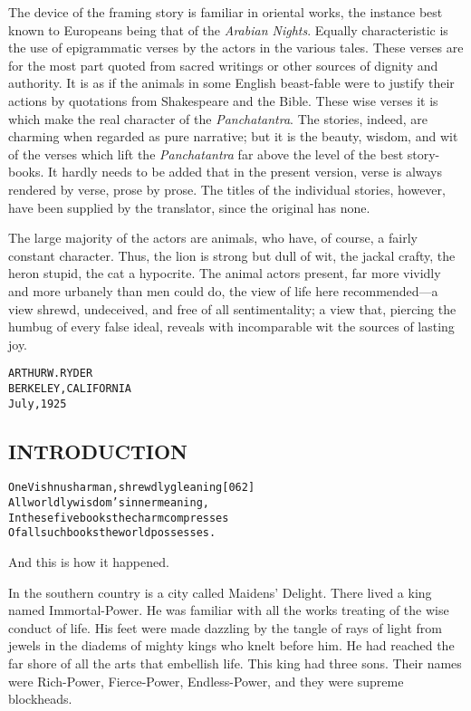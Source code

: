 \documentclass{article}
\renewenvironment{verbatim}{\begin{alltt}\normalfont\begin{centering}}{\end{centering}\end{alltt}}
\begin{document}
The device of the framing story is familiar in oriental works, the
instance best known to Europeans being that of the
\emph{Arabian Nights}. Equally characteristic is the use of
epigrammatic verses by the actors in the various tales. These
verses are for the most part quoted from sacred writings or other
sources of dignity and authority. It is as if the animals in some
English beast-fable were to justify their actions by quotations
from Shakespeare and the Bible. These wise verses it is which make
the real character of the \emph{Panchatantra}. The stories, indeed,
are charming when regarded as pure narrative; but it is the beauty,
wisdom, and wit of the verses which lift the \emph{Panchatantra}
far above the level of the best story-books. It hardly needs to be
added that in the present version, verse is always rendered by
verse, prose by prose. The titles of the individual stories,
however, have been supplied by the translator, since the original
has none.

The large majority of the actors are animals, who have, of course,
a fairly constant character. Thus, the lion is strong but dull of
wit, the jackal crafty, the heron stupid, the cat a hypocrite. The
animal actors present, far more vividly and more urbanely than men
could do, the view of life here recommended---a view shrewd,
undeceived, and free of all sentimentality; a view that, piercing
the humbug of every false ideal, reveals with incomparable wit the
sources of lasting joy.

\begin{verbatim}
                            ARTHUR W. RYDER
                            BERKELEY, CALIFORNIA
                            July, 1925
\end{verbatim}
\subsection{INTRODUCTION}

\begin{verbatim}
One Vishnusharman, shrewdly gleaning                    [062]
All worldly wisdom's inner meaning,
In these five books the charm compresses
Of all such books the world possesses.
\end{verbatim}
And this is how it happened.

In the southern country is a city called Maidens' Delight. There
lived a king named Immortal-Power. He was familiar with all the
works treating of the wise conduct of life. His feet were made
dazzling by the tangle of rays of light from jewels in the diadems
of mighty kings who knelt before him. He had reached the far shore
of all the arts that embellish life. This king had three sons.
Their names were Rich-Power, Fierce-Power, Endless-Power, and they
were supreme blockheads.
\end{document}
